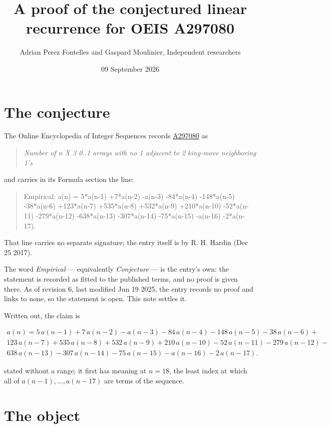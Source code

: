 \documentclass[11pt]{article}
\title{A proof of the conjectured linear recurrence for OEIS A297080}
\author{Adrian Perez Fontelles and Gaspard Moulinier, Independent researchers}
\date{09 September 2026}
\theoremstyle{definition}
\begin{document}
\maketitle
\section{The conjecture}

The Online Encyclopedia of Integer Sequences records \href{https://oeis.org/A297080}{A297080} as

\begin{quote}\itshape Number of n X 3 0..1 arrays with no 1 adjacent to 2 king-move neighboring 1's\end{quote}

and carries in its Formula section the line:

\begin{quote}\ttfamily Empirical: a(n) = 5*a(n-1) +7*a(n-2) -a(n-3) -84*a(n-4) -148*a(n-5) -38*a(n-6) +123*a(n-7) +535*a(n-8) +532*a(n-9) +210*a(n-10) -52*a(n-11) -279*a(n-12) -638*a(n-13) -307*a(n-14) -75*a(n-15) -a(n-16) -2*a(n-17).\end{quote}

That line carries no separate signature; the entry itself is by R. H. Hardin (Dec 25 2017).

The word {\itshape Empirical} --- equivalently {\itshape Conjecture} --- is the entry's own: the statement is recorded as fitted to the published terms, and no proof is given there. As of revision 6, last modified Jun 19 2025, the entry records no proof and links to none, so the statement is open. This note settles it.

Written out, the claim is

\begin{multline*} a(n) = 5\,a(n-1) + 7\,a(n-2) - a(n-3) - 84\,a(n-4) - 148\,a(n-5) - 38\,a(n-6) + \\ 123\,a(n-7) + 535\,a(n-8) + 532\,a(n-9) + 210\,a(n-10) - 52\,a(n-11) - 279\,a(n-12) - \\ 638\,a(n-13) - 307\,a(n-14) - 75\,a(n-15) - a(n-16) - 2\,a(n-17). \end{multline*}

stated without a range; it first has meaning at $n = 18$, the least index at which all of $a(n-1),\dots,a(n-17)$ are terms of the sequence.

\section{The object}
\end{document}
